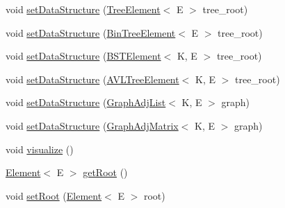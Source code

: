 \begin{DoxyCompactItemize}
\item 
void \hyperlink{classbridges_1_1connect_1_1_bridges_a0788905a16b9a8f3deb0b4a344f2b42d}{set\+Data\+Structure} (\hyperlink{classbridges_1_1base_1_1_tree_element}{Tree\+Element}$<$ E $>$ tree\+\_\+root)
\item 
void \hyperlink{classbridges_1_1connect_1_1_bridges_a02a3d74b381473b5d97a8f8194df9b40}{set\+Data\+Structure} (\hyperlink{classbridges_1_1base_1_1_bin_tree_element}{Bin\+Tree\+Element}$<$ E $>$ tree\+\_\+root)
\item 
void \hyperlink{classbridges_1_1connect_1_1_bridges_adb01a9385de48ef267bdfd22758fb361}{set\+Data\+Structure} (\hyperlink{classbridges_1_1base_1_1_b_s_t_element}{B\+S\+T\+Element}$<$ K, E $>$ tree\+\_\+root)
\item 
void \hyperlink{classbridges_1_1connect_1_1_bridges_a702c3f88840e100ad0182110627e60f5}{set\+Data\+Structure} (\hyperlink{classbridges_1_1base_1_1_a_v_l_tree_element}{A\+V\+L\+Tree\+Element}$<$ K, E $>$ tree\+\_\+root)
\item 
void \hyperlink{classbridges_1_1connect_1_1_bridges_aa5dc1d094955a486e649fdb05d66502f}{set\+Data\+Structure} (\hyperlink{classbridges_1_1base_1_1_graph_adj_list}{Graph\+Adj\+List}$<$ K, E $>$ graph)
\item 
void \hyperlink{classbridges_1_1connect_1_1_bridges_a1ac1f8a7c5e95500712c2edaa5e8971f}{set\+Data\+Structure} (\hyperlink{classbridges_1_1base_1_1_graph_adj_matrix}{Graph\+Adj\+Matrix}$<$ K, E $>$ graph)
\item 
void \hyperlink{classbridges_1_1connect_1_1_bridges_a6881ed6e3f3a1db1d3cda249eb8543a1}{visualize} ()
\item 
\hyperlink{classbridges_1_1base_1_1_element}{Element}$<$ E $>$ \hyperlink{classbridges_1_1connect_1_1_bridges_ad46be93cba155fa93fd9082d9d813466}{get\+Root} ()
\item 
void \hyperlink{classbridges_1_1connect_1_1_bridges_aa05295718a1fefa2917dbaf874c79415}{set\+Root} (\hyperlink{classbridges_1_1base_1_1_element}{Element}$<$ E $>$ root)
\end{DoxyCompactItemize}
